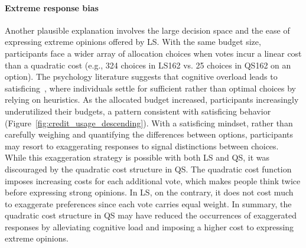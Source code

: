 \paragraph{Extreme response bias}
Another plausible explanation involves the large decision space and the ease of expressing extreme opinions offered by LS. With the same budget size, participants face a wider array of allocation choices when votes incur a linear cost than a quadratic cost (e.g., 324 choices in LS162 vs. 25 choices in QS162 on an option). The psychology literature suggests that cognitive overload leads to satisficing~\cite{schwartzMaximizingSatisficingHappiness2002, iyengarWhenChoiceDemotivating2000}, where individuals settle for sufficient rather than optimal choices by relying on heuristics. As the allocated budget increased, participants increasingly underutilized their budgets, a pattern consistent with satisficing behavior (Figure~\ref{fig:credit_usage_descending}). With a satisficing mindset, rather than carefully weighing and quantifying the differences between options, participants may resort to exaggerating responses to signal distinctions between choices. While this exaggeration strategy is possible with both LS and QS, it was discouraged by the quadratic cost structure in QS. The quadratic cost function imposes increasing costs for each additional vote, which makes people think twice before expressing strong opinions. In LS, on the contrary, it does not cost much to exaggerate preferences since each vote carries equal weight. In summary, the quadratic cost structure in QS may have reduced the occurrences of exaggerated responses by alleviating cognitive load and imposing a higher cost to expressing extreme opinions.

